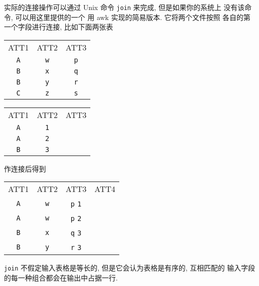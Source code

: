 实际的连接操作可以通过 Unix 命令 \texttt{join} 来完成, 但是如果你的系统上
没有该命令, 可以用这里提供的一个 用 awk 实现的简易版本. 它将两个文件按照
各自的第一个字段进行连接, 比如下面两张表
\begin{tabular}{c|c|c}
    \hline
    \hline
    ATT1    & ATT2 & ATT3 \\
    \texttt{A}       & \texttt{w}    & \texttt{p}    \\
    \texttt{B}       & \texttt{x}    & \texttt{q}   \\
    \texttt{B}      & \texttt{y}    & \texttt{r}    \\
    \texttt{C}      & \texttt{z}    & \texttt{s}    \\
    \hline
\end{tabular}
\begin{tabular}{c|c|c}
    \hline
    \hline
    ATT1    & ATT2 & ATT3 \\
    \texttt{A}       & \texttt{1}   \\  
    \texttt{A}       & \texttt{2}   \\
    \texttt{B}      & \texttt{3}    \\
    \hline
\end{tabular}
作连接后得到
\begin{tabular}{c|c|c|c}
    \hline
    \hline
    ATT1        & ATT2  & ATT3   &   ATT4   \\
    \texttt{A}  & \texttt{w}    & \texttt{p}    \texttt{1}  \\
    \texttt{A}  & \texttt{w}    & \texttt{p}    \texttt{2}  \\
    \texttt{B}  & \texttt{x}    & \texttt{q}    \texttt{3}  \\
    \texttt{B}  & \texttt{y}    & \texttt{r}    \texttt{3}  \\
\end{tabular}
\texttt{join} 不假定输入表格是等长的, 但是它会认为表格是有序的, 互相匹配的
输入字段的每一种组合都会在输出中占据一行.

